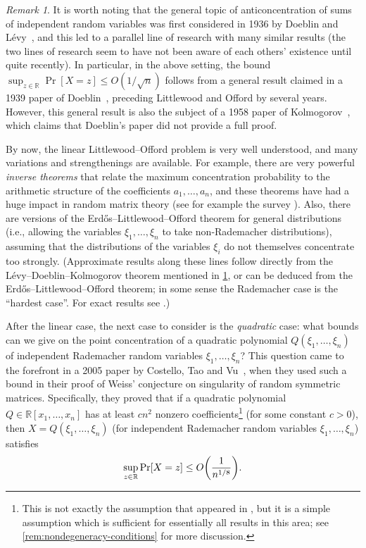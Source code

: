 \documentclass[english]{article}
\theoremstyle{remark}
\newtheorem{remark}{Remark}[section]
\numberwithin{equation}{section}
\numberwithin{figure}{section}
\newcommand{\RR}{\mathbb{R}}
\let\originalleft\left
\let\originalright\right
\renewcommand{\left}{\mathopen{}\mathclose\bgroup\originalleft}
\renewcommand{\right}{\aftergroup\egroup\originalright}
\begin{document}
\begin{remark}\label{rem:levy}
It is worth noting that the general topic of anticoncentration of
sums of independent random variables was first considered in 1936
by Doeblin and L\'evy~\cite{DL36}, and this led to a parallel line
of research with many similar results (the two lines of research seem
to have not been aware of each others' existence until quite recently).
In particular, in the above setting, the bound $\sup_{z\in\RR}\Pr[X=z]\le O(1/\sqrt{n})$ follows from a general result claimed in a 1939 paper
of Doeblin~\cite{Doe39}, preceding Littlewood and Offord by several
years. However, this general result is also the subject of a 1958
paper of Kolmogorov~\cite{Kol58}, which claims that Doeblin's paper
did not provide a full proof.
\end{remark}

By now, the linear Littlewood--Offord problem is very well understood, and many variations and strengthenings are available. For example, there are very powerful \emph{inverse theorems} that relate the maximum concentration probability to the arithmetic structure of the coefficients $a_1,\dots,a_n$, and these theorems have had a huge impact in random matrix theory (see for example the survey \cite{NV13}). Also, there are versions of the Erd\H os--Littlewood--Offord theorem for general
distributions (i.e., allowing the variables $\xi_{1},\dots,\xi_{n}$ to take non-Rademacher
distributions), assuming that the distributions of the variables $\xi_{i}$ do
not themselves concentrate too strongly. (Approximate results along these lines follow directly from the L\'evy--Doeblin--Kolmogorov theorem mentioned in \cref{rem:levy}, or can be deduced from the Erd\H os--Littlewood--Offord theorem; in some sense the Rademacher case is the ``hardest case''. For exact results see \cite{Jon78,Jus22,LR94}.)

After the linear case, the next case to consider is the \emph{quadratic} case: what bounds can we
give on the point concentration of a quadratic polynomial $Q(\xi_{1},\dots,\xi_{n})$
of independent Rademacher random variables $\xi_{1},\dots,\xi_{n}$?
This question came to the forefront in a 2005 paper by Costello, Tao and
Vu~\cite{CTV06}, when they used such a bound in their proof of Weiss'
conjecture on singularity of random symmetric matrices. Specifically,
they proved that if a quadratic polynomial $Q\in\RR[x_{1},\dots,x_{n}]$
has at least $cn^{2}$ nonzero coefficients\footnote{This is not exactly the assumption that appeared in \cite{CTV06}, but it is a simple assumption which is sufficient for essentially all results in this area; see \cref{rem:nondegeneracy-conditions} for more discussion.} (for some constant $c>0$),
then $X=Q(\xi_{1},\dots,\xi_{n})$ (for independent Rademacher random variables
$\xi_{1},\dots,\xi_{n}$) satisfies
\begin{equation}
\sup_{z\in\RR}\Pr[X=z]\le O\left(\frac{1}{n^{1/8}}\right).\label{eq:CTV}
\end{equation}
\end{document}
